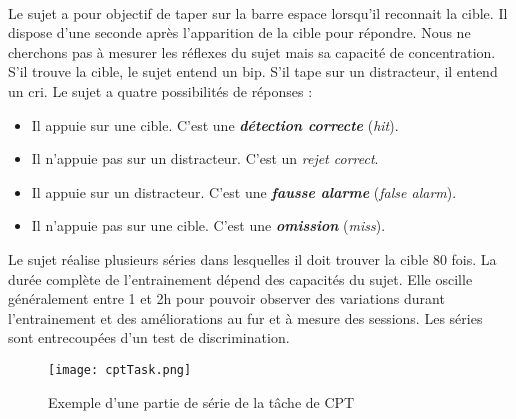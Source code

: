 \paragraph{}Le sujet a pour objectif de taper sur la barre espace lorsqu'il reconnait la cible. Il dispose d'une seconde après l'apparition de la cible pour répondre. Nous ne cherchons
pas à mesurer les réflexes du sujet mais sa capacité de concentration. S'il trouve la cible, le sujet entend un bip. S'il tape sur un distracteur, il entend un cri. Le sujet a quatre
possibilités de réponses :
\begin{itemize}
\item Il appuie sur une cible. C'est une \textbf{\emph{détection correcte}} (\emph{hit}).
\item Il n'appuie pas sur un distracteur. C'est un \emph{rejet correct}.
\item Il appuie sur un distracteur. C'est une \textbf{\emph{fausse alarme}} (\emph{false alarm}).
\item Il n'appuie pas sur une cible. C'est une \textbf{\emph{omission}} (\emph{miss}).
\end{itemize}
Le sujet réalise plusieurs séries dans lesquelles il doit trouver la cible 80 fois. La durée complète de l'entrainement dépend des capacités du sujet. Elle oscille généralement entre
1 et 2h pour pouvoir observer des variations durant l'entrainement et des améliorations au fur et à mesure des sessions. Les séries sont entrecoupées d'un test de discrimination.

\begin{figure}[H]
    \begin{center}
    \texttt{[image: cptTask.png]}
    \end{center}
    \caption{Exemple d'une partie de série de la tâche de CPT}
\label{CptTask}
\end{figure}

